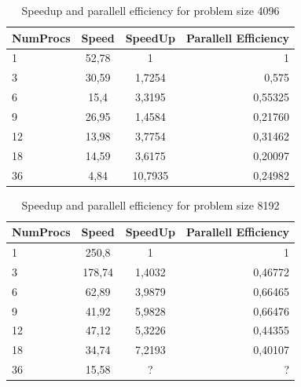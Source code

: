 \begin{table}[ht]
    \begin{tabular}{l | c | c | r}
        NumProcs & Speed & SpeedUp & Parallell Efficiency \\
        \hline
        1 & 52,78 & 1 & 1 \\
        3 & 30,59 & 1,7254 & 0,575 \\
        6 & 15,4 & 3,3195 & 0,55325 \\
        9 & 26,95 & 1,4584 & 0,21760 \\
        12 & 13,98 & 3,7754 & 0,31462 \\
        18 & 14,59 & 3,6175 & 0,20097 \\
        36 & 4,84 & 10,7935 & 0,24982 \\
        \hline
    \end{tabular}
    \caption{Speedup and parallell efficiency for problem size 4096}
\end{table}

\begin{table}[ht]
       \begin{tabular}{l | c | c | r}
        NumProcs & Speed & SpeedUp & Parallell Efficiency \\
        \hline
        1 & 250,8 & 1 & 1 \\
        3 & 178,74 & 1,4032 & 0,46772 \\
        6 & 62,89 & 3,9879 & 0,66465 \\
        9 & 41,92 & 5,9828 & 0,66476 \\
        12 & 47,12 & 5,3226 & 0,44355 \\
        18 & 34,74 & 7,2193 & 0,40107 \\
        36 & 15,58 & ? & ? \\
        \hline
    \end{tabular}
\caption{Speedup and parallell efficiency for problem size 8192}
\end{table}
\FloatBarrier